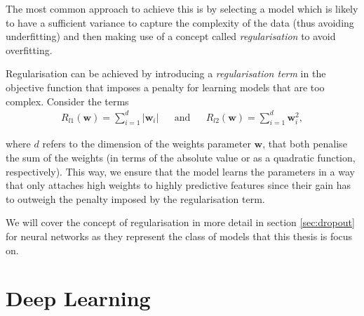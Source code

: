 The most common approach to achieve this is by selecting a model which is likely to have a sufficient variance to capture the complexity of the data (thus avoiding underfitting) and then making use of a concept called \emph{regularisation} to avoid overfitting. 

Regularisation can be achieved by introducing a \emph{regularisation term} in the objective function that imposes a penalty for learning models that are too complex. Consider the terms 
\begin{align} 
R_{l1}(\mathbf{w}) = \sum_{i=1}^{d}  \lvert \mathbf{w}_i \lvert  && \text{and} &&R_{l2}(\mathbf{w}) = \sum_{i=1}^{d}  \mathbf{w}_i^2,
\end{align} 

where $d$ refers to the dimension of the weights parameter $\mathbf{w}$, that both penalise the sum of the weights (in terms of the absolute value or as a quadratic function, respectively). This way, we ensure that the model learns the parameters in a way that only attaches high weights to highly predictive features since their gain has to outweigh the penalty imposed by the regularisation term. 
 
We will cover the concept of regularisation in more detail in section \ref{sec:dropout} for neural networks as they represent the class of models that this thesis is focus on. 


%
%






\section{Deep Learning}
